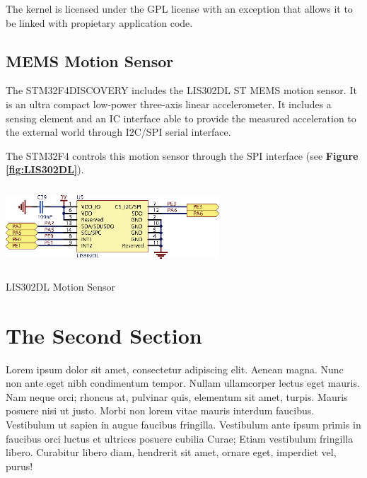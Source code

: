 \documentclass[a4paper,10pt]{article}
\makeatletter
\newenvironment{figurehere}{\def\@captype{figure}\vspace{2ex}}{\vspace{2ex}}
\makeatother
\begin{document}
\begin{multicols}{2}
The kernel is licensed under the GPL license with an exception that allows it to be linked with propietary application code.

\subsection{MEMS Motion Sensor}

The STM32F4DISCOVERY includes the LIS302DL ST MEMS motion sensor.
It is an ultra compact low-power three-axis linear accelerometer. It includes
a sensing element and an IC interface able to provide the measured acceleration
to the external world through I2C/SPI serial interface.

The STM32F4 controls this motion sensor through the SPI interface (see {\bf Figure
\ref{fig:LIS302DL}}). 

\begin{figurehere}
 \centering
 \includegraphics[width=8cm, height=3cm]{./eps/LIS302DL.eps}
 \caption{LIS302DL Motion Sensor}
 \label{fig:LIS302DL}
\end{figurehere}

\section{The Second Section}

Lorem ipsum dolor sit amet, consectetur adipiscing elit.  Aenean magna. Nunc non
ante eget nibh condimentum tempor. Nullam ullamcorper lectus eget mauris. Nam
neque orci; rhoncus at, pulvinar quis, elementum sit amet, turpis. Mauris
posuere nisi ut justo. Morbi non lorem vitae mauris interdum faucibus.
Vestibulum ut sapien in augue faucibus fringilla. Vestibulum ante ipsum primis
in faucibus orci luctus et ultrices posuere cubilia Curae; Etiam vestibulum
fringilla libero. Curabitur libero diam, hendrerit sit amet, ornare eget,
imperdiet vel, purus!



\end{multicols}
\end{document}
